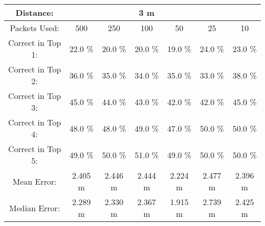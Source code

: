 \begin{tabular}{| c || c | c | c | c | c | c |}
\hline
Distance: &  &  & 3 m &  &  & \\
\hline
Packets Used: & 500 & 250 & 100 & 50 & 25 & 10 \\
\hline
\hline
Correct in Top 1: & 22.0 \% & 20.0 \% & 20.0 \% & 19.0 \% & 24.0 \% & 23.0 \% \\
\hline
Correct in Top 2: & 36.0 \% & 35.0 \% & 34.0 \% & 35.0 \% & 33.0 \% & 38.0 \% \\
\hline
Correct in Top 3: & 45.0 \% & 44.0 \% & 43.0 \% & 42.0 \% & 42.0 \% & 45.0 \% \\
\hline
Correct in Top 4: & 48.0 \% & 48.0 \% & 49.0 \% & 47.0 \% & 50.0 \% & 50.0 \% \\
\hline
Correct in Top 5: & 49.0 \% & 50.0 \% & 51.0 \% & 49.0 \% & 50.0 \% & 50.0 \% \\
\hline
\hline
Mean Error: & 2.405 m & 2.446 m & 2.444 m & 2.224 m & 2.477 m & 2.396 m \\
\hline
Median Error: & 2.289 m & 2.330 m & 2.367 m & 1.915 m & 2.739 m & 2.425 m \\
\hline
\end{tabular}